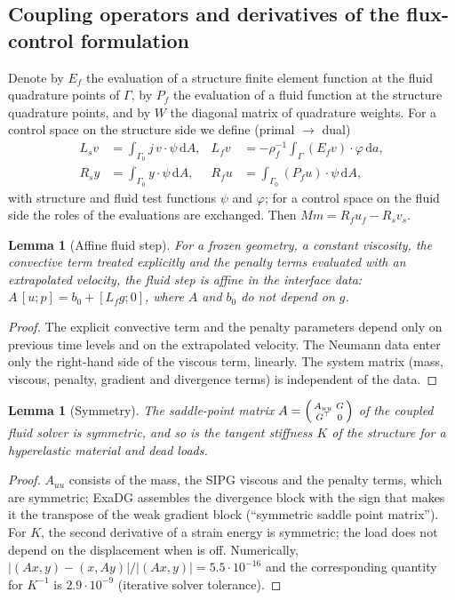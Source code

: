 \documentclass[11pt,a4paper]{article}
\newtheorem{lemma}[proposition]{Lemma}
\theoremstyle{definition}
\theoremstyle{remark}
\newcommand{\G}{\Gamma}
\newcommand{\M}{M}
\newcommand{\dd}{\,\mathrm{d}}
\begin{document}
\subsection{Coupling operators and derivatives of the flux-control formulation}

Denote by $E_f$ the evaluation of a structure finite element function at the fluid quadrature
points of $\G$, by $P_f$ the evaluation of a fluid function at the structure quadrature points, and
by $W$ the diagonal matrix of quadrature weights. For a control space on the structure side we
define (primal $\to$ dual)
\begin{align*}
  L_s v &= \textstyle\int_{\G_0} j\,v\cdot\psi \dd A, &
  L_f v &= -\rho_f^{-1}\textstyle\int_{\G} (E_f v)\cdot\varphi \dd a, \\
  R_s y &= \textstyle\int_{\G_0} y\cdot\psi \dd A, &
  R_f u &= \textstyle\int_{\G_0} (P_f u)\cdot\psi \dd A ,
\end{align*}
with structure and fluid test functions $\psi$ and $\varphi$; for a control space on the fluid side
the roles of the evaluations are exchanged. Then $\M m = R_f u_f - R_s v_s$.

\begin{lemma}[Affine fluid step]\label{lem:affine}
For a frozen geometry, a constant viscosity, the convective term treated explicitly and the
penalty terms evaluated with an extrapolated velocity, the fluid step is affine in the interface
data: $A\,[u;p] = b_0 + [L_f g;0]$, where $A$ and $b_0$ do not depend on $g$.
\end{lemma}
\begin{proof}
The explicit convective term and the penalty parameters depend only on previous time levels and on
the extrapolated velocity. The Neumann data enter only the right-hand side of the viscous term,
linearly. The system matrix (mass, viscous, penalty, gradient and divergence terms) is independent
of the data.
\end{proof}

\begin{lemma}[Symmetry]\label{lem:symmetry}
The saddle-point matrix $A=\begin{psmallmatrix} A_{uu} & G\\ G^{\top} & 0\end{psmallmatrix}$ of the
coupled fluid solver is symmetric, and so is the tangent stiffness $K$ of the structure for a
hyperelastic material and dead loads.
\end{lemma}
\begin{proof}
$A_{uu}$ consists of the mass, the SIPG viscous and the penalty terms, which are symmetric; ExaDG
assembles the divergence block with the sign that makes it the transpose of the weak gradient block
(``symmetric saddle point matrix''). For $K$, the second derivative of a strain energy is
symmetric; the load does not depend on the displacement when  is off.
Numerically, $|(Ax,y)-(x,Ay)|/|(Ax,y)| = 5.5\cdot10^{-16}$ and the corresponding quantity for
$K^{-1}$ is $2.9\cdot10^{-9}$ (iterative solver tolerance).
\end{proof}
\end{document}
